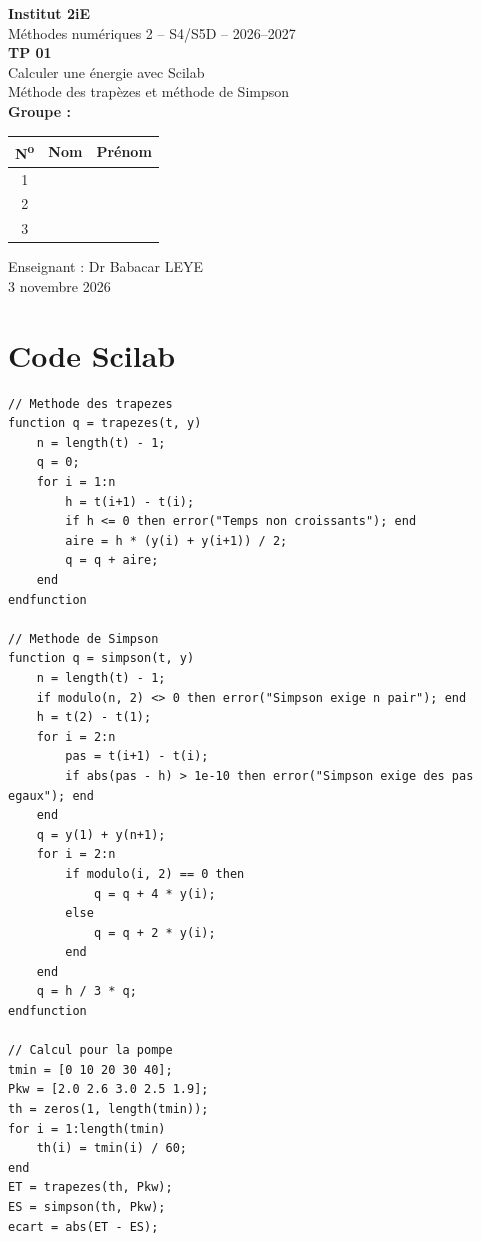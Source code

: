 \documentclass[11pt,a4paper]{article}
\begin{document}
\begin{titlepage}
\centering
\vspace*{1cm}
{\Large \textbf{Institut 2iE}}\\[0.4cm]
{\large Méthodes numériques 2 -- S4/S5D -- 2026--2027}\\[2.5cm]

{\Huge \textbf{TP 01}}\\[0.6cm]
{\LARGE Calculer une énergie avec Scilab}\\[0.4cm]
{\large Méthode des trapèzes et méthode de Simpson}\\[2.5cm]

{\large \textbf{Groupe :}}\\[0.4cm]
\renewcommand{\arraystretch}{1.6}
\begin{tabular}{|c|p{5.5cm}|p{5.5cm}|}
\hline
\textbf{N\textsuperscript{o}} & \textbf{Nom} & \textbf{Prénom}\\
\hline
1 & & \\
\hline
2 & & \\
\hline
3 & & \\
\hline
\end{tabular}

\vfill
{\large Enseignant : Dr Babacar LEYE}\\[0.3cm]
{\large 3 novembre 2026}
\end{titlepage}





\appendix
\section{Code Scilab}
\begin{lstlisting}
// Methode des trapezes
function q = trapezes(t, y)
    n = length(t) - 1;
    q = 0;
    for i = 1:n
        h = t(i+1) - t(i);
        if h <= 0 then error("Temps non croissants"); end
        aire = h * (y(i) + y(i+1)) / 2;
        q = q + aire;
    end
endfunction

// Methode de Simpson
function q = simpson(t, y)
    n = length(t) - 1;
    if modulo(n, 2) <> 0 then error("Simpson exige n pair"); end
    h = t(2) - t(1);
    for i = 2:n
        pas = t(i+1) - t(i);
        if abs(pas - h) > 1e-10 then error("Simpson exige des pas egaux"); end
    end
    q = y(1) + y(n+1);
    for i = 2:n
        if modulo(i, 2) == 0 then
            q = q + 4 * y(i);
        else
            q = q + 2 * y(i);
        end
    end
    q = h / 3 * q;
endfunction

// Calcul pour la pompe
tmin = [0 10 20 30 40];
Pkw = [2.0 2.6 3.0 2.5 1.9];
th = zeros(1, length(tmin));
for i = 1:length(tmin)
    th(i) = tmin(i) / 60;
end
ET = trapezes(th, Pkw);
ES = simpson(th, Pkw);
ecart = abs(ET - ES);
\end{lstlisting}
\end{document}
